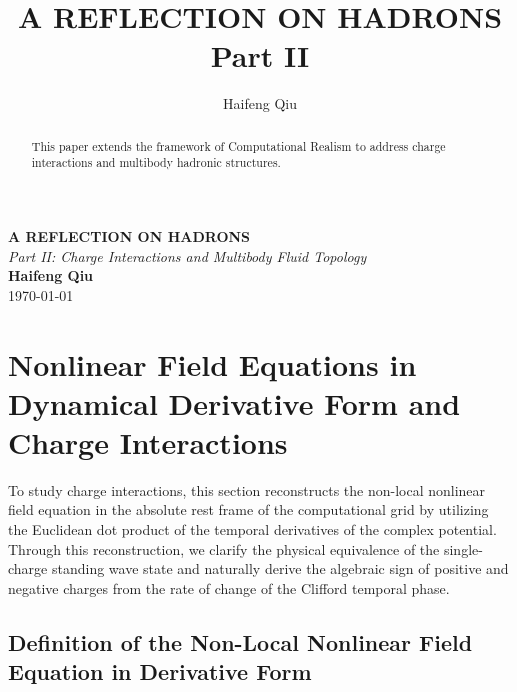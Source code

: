 \documentclass[12pt, a4paper]{article}
\title{A REFLECTION ON HADRONS Part II}
\author{Haifeng Qiu}
\begin{document}
\begin{center}
    {\uppercase{\Large \textbf{A REFLECTION ON HADRONS}}} \\
    \vspace{0.5em}
    {\large \textit{Part II:  Charge Interactions and Multibody Fluid Topology}} \\
    \vspace{2em}
    \textbf{Haifeng Qiu} \\
    \today
    \vspace{2em}
\end{center}
\begin{abstract}
This paper extends the framework of Computational Realism to address charge interactions and multibody hadronic structures.
\end{abstract}





\section{Nonlinear Field Equations in Dynamical Derivative Form and Charge Interactions}

To study charge interactions, this section reconstructs the non-local nonlinear field equation in the absolute rest frame of the computational grid by utilizing the Euclidean dot product of the temporal derivatives of the complex potential. Through this reconstruction, we clarify the physical equivalence of the single-charge standing wave state and naturally derive the algebraic sign of positive and negative charges from the rate of change of the Clifford temporal phase.

\subsection{Definition of the Non-Local Nonlinear Field Equation in Derivative Form}
\end{document}
